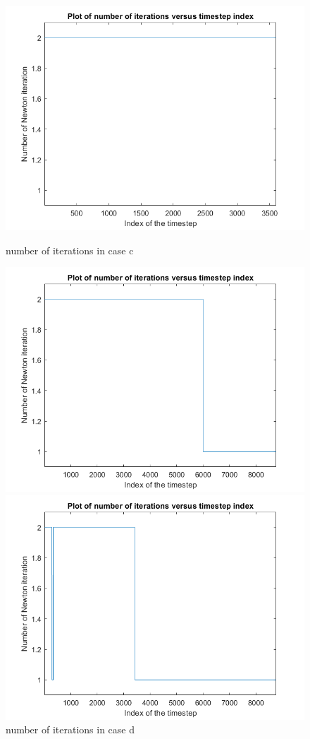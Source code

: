 \documentclass[12pt]{article}
\begin{document}
\begin{figure}[H]
  \includegraphics[width=\linewidth]{1c plot 2.png}
  \caption{number of iterations in case c}\label{fig:awesome_image1}
\endminipage\hfill
{}
  \includegraphics[width=\linewidth]{1d plot 2.png}
  \caption{number of iterations in case d}\label{fig:awesome_image2}
\endminipage\hfill
{}%
  \includegraphics[width=\linewidth]{1e plot 2.png}

\end{figure}
\end{document}
